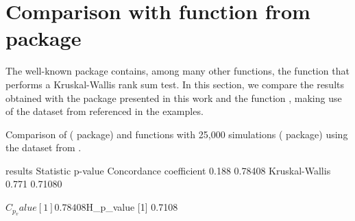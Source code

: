  
\section{Comparison with  function from  package}\label{sec:kruskal.test}

The well-known  package contains, among many other functions, the function  that performs a Kruskal-Wallis rank sum test. In this section, we compare the results obtained with the  package presented in this work and the function , making use of the dataset from \cite{Hollander1973} referenced in the  examples.

\setcounter{exmp}{3}
\begin{exmp} \label{ex:4}
Comparison of  ( package) and  functions with 25,000 simulations ( package) using the dataset from \cite{Hollander1973}.

\begin{example}

results
                        Statistic p-value
Concordance coefficient     0.188 0.78408
Kruskal-Wallis              0.771 0.71080

$C_p_value
[1] 0.78408

$H_p_value
[1] 0.7108

\end{example}
\end{exmp}




\address{Javier Alcaraz\\
  Center of Operations Research, Miguel Hern\'andez University\\
  Avda. Universidad sn, 03202 Elche (Spain)\\
  E-mail: \\
}

\vspace{-0.1cm}

\address{Laura Anton-Sanchez\\
	Center of Operations Research, Miguel Hern\'andez University\\
  Avda. Universidad sn, 03202 Elche (Spain)\\
  E-mail: \\
}

\vspace{-0.1cm}

\address{Juan Francisco Monge\\
	Center of Operations Research, Miguel Hern\'andez University\\
  Avda. Universidad sn, 03202 Elche (Spain)\\
  E-mail: \\
}
